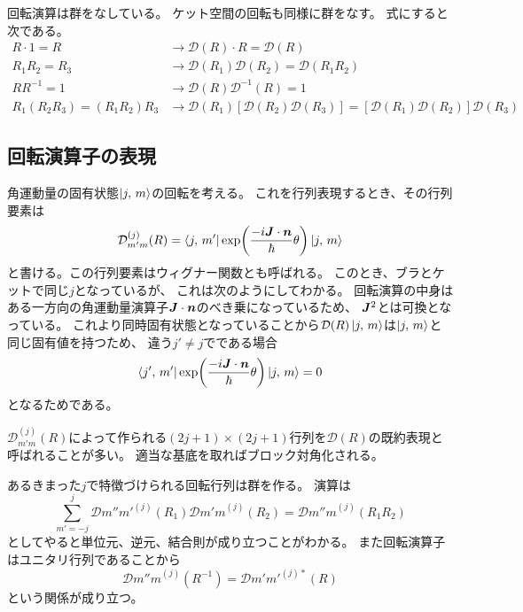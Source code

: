 \documentclass[../../master.tex]{subfiles}
\begin{document}
回転演算は群をなしている。
ケット空間の回転も同様に群をなす。
式にすると次である。
\begin{align}
    R\cdot 1 = R &\rightarrow \mathcal{D}(R) \cdot R = \mathcal{D}(R)\\
    R_1 R_2 =R_3 &\rightarrow \mathcal{D}(R_1)\mathcal{D}(R_2) = \mathcal{D}(R_1R_2)\\
    RR^{-1}=1 &\rightarrow \mathcal{D}(R)\mathcal{D}^{-1}(R)=1\\
    R_1(R_2R_3) = (R_1R_2)R_3
        &\rightarrow \mathcal{D}(R_1) [\mathcal{D}(R_2)\mathcal{D}(R_3)] = [\mathcal{D}(R_1) \mathcal{D}(R_2)]\mathcal{D}(R_3)
\end{align}

\subsection{回転演算子の表現}
角運動量の固有状態\(\ket{j,\,m}\)の回転を考える。
これを行列表現するとき、その行列要素は
\begin{equation}
    \mathcal{D}_{m'm}^{(j)}(R) = \bra{j,\,m'} \exp(\frac{-i\vb*{J}\cdot\vb*{n}}{\hbar}\theta)\ket{j,\,m}
\end{equation}
と書ける。この行列要素はウィグナー関数とも呼ばれる。
このとき、ブラとケットで同じ\(j\)となっているが、
これは次のようにしてわかる。
回転演算の中身はある一方向の角運動量演算子\(\vb*{J}\cdot\vb*{n}\)のべき乗になっているため、
\(\vb*{J}^2\)とは可換となっている。
これより同時固有状態となっていることから\(\mathcal{D}(R)\ket{j,\,m}\)は\(\ket{j,\,m}\)と同じ固有値を持つため、
違う\(j'\neq j\)でである場合
\begin{equation}
    \bra{j',\,m'} \exp(\frac{-i\vb*{J}\cdot\vb*{n}}{\hbar}\theta)\ket{j,\,m} = 0
\end{equation}
となるためである。

\(\mathcal{D}_{m'm}^{(j)}(R)\)によって作られる\((2j+1)\times(2j+1)\)行列を\(\mathcal{D}(R)\)の既約表現と呼ばれることが多い。
適当な基底を取ればブロック対角化される。

あるきまった\(j\)で特徴づけられる回転行列は群を作る。
演算は
\begin{equation}
    \sum_{m'=-j}^{j}\mathcal{D}{m''m'}^{(j)}(R_1)\mathcal{D}{m'm}^{(j)}(R_2) = \mathcal{D}{m''m}^{(j)}(R_1R_2)
\end{equation}
としてやると単位元、逆元、結合則が成り立つことがわかる。
また回転演算子はユニタリ行列であることから
\begin{equation}
    \mathcal{D}{m''m}^{(j)}(R^{-1})=\mathcal{D}{m'm'}^{(j)*}(R)
\end{equation}
という関係が成り立つ。
\end{document}
